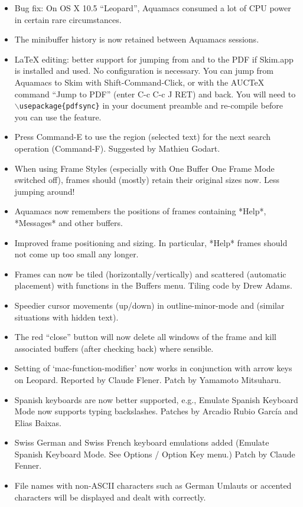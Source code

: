 \begin{itemize}

\item Bug fix: On OS X 10.5 ``Leopard'', Aquamacs consumed a lot of CPU power in certain rare circumstances.
\item The minibuffer history is now retained between Aquamacs sessions.
\item LaTeX editing: better support for jumping from and to the PDF if Skim.app is installed and used. No configuration is necessary. You can jump from Aquamacs to Skim with Shift-Command-Click, or with the AUCTeX command ``Jump to PDF'' (enter C-c C-c J RET) and back. You will need to {\tt $\backslash$usepackage\{pdfsync\}} in your document preamble and re-compile before you can use the feature.
\item Press Command-E to use the region (selected text) for the next  search operation (Command-F).
Suggested by Mathieu Godart.
\item When using Frame Styles (especially with One Buffer One Frame Mode switched off), frames should (mostly) retain their original sizes now. Less jumping around!
\item Aquamacs now remembers the positions of frames containing *Help*, *Messages* and other buffers.
\item Improved frame positioning and sizing. In particular, *Help* frames should not come up too small any longer.
\item Frames can now be tiled (horizontally/vertically) and scattered (automatic placement) with functions in the Buffers menu.
Tiling code by Drew Adams.
\item Speedier cursor movements (up/down) in outline-minor-mode and (similar situations with hidden text).
\item The red ``close'' button will now delete all windows of the frame and kill associated buffers (after checking back) where sensible.
\item Setting of `mac-function-modifier' now works in conjunction with arrow keys on Leopard.
Reported by Claude Flener. Patch by Yamamoto Mitsuharu.
\item Spanish keyboards are now better supported, e.g., Emulate Spanish Keyboard Mode now supports typing backslashes.
Patches by Arcadio Rubio García and Elias Baixas.
\item Swiss German and Swiss French keyboard emulations added (Emulate Spanish Keyboard Mode. See Options / Option Key menu.)
Patch by Claude Fenner.
\item File names with non-ASCII characters such as German Umlauts or accented characters will be displayed and dealt with correctly.

\end{itemize}
